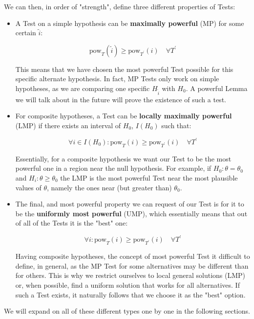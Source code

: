 We can then, in order of "strength", define three different properties of Tests:
\begin{itemize}
\item
A Test on a simple hypothesis can be \textbf{maximally powerful} (MP) for some certain $\tilde{i}$:

	\[
	\text{pow}_T(\tilde{i})\geq\text{pow}_{T^\prime}(i)\quad \forall T^\prime
	\tag{MP Test}
	\]

This means that we have chosen the most powerful Test possible for this specific alternate hypothesis. In fact, MP Tests only work on simple hypotheses, as we are comparing one specific $H_{\tilde{i}}$ with $H_0$. A powerful Lemma we will talk about in the future will prove the existence of such a test. 

\item
For composite hypotheses, a Test can be \textbf{locally maximally powerful} (LMP) if there exists an interval of $H_0$, $I(H_0)$ such that:


	\[
	\forall i\in I(H_0): \text{pow}_T(i) \geq \text{pow}_{T^\prime}(i) \quad \forall T^\prime
	\tag{LMP Test}
	\]

Essentially, for a composite hypothesis we want our Test to be the most powerful one in a region near the null hypothesis. For example, if $H_0: \theta= \theta_0$ and $H_i: \theta\geq\theta_0$ the LMP is the most powerful Test near the most plausible values of $\theta$, namely the ones near (but greater than) $\theta_0$.

\item
The final, and most powerful property we can request of our Test is for it to be the \textbf{uniformly most powerful} (UMP), which essentially means that out of all of the Tests it is the "best" one:

	\[
	\forall i: \text{pow}_T(i) \geq \text{pow}_{T^\prime}(i) \quad \forall T^\prime
	\tag{UMP Test}
	\]

Having composite hypotheses, the concept of most powerful Test it difficult to define, in general, as the MP Test for some alternatives may be different than for others. This is why we restrict ourselves to local general solutions (LMP) or, when possible, find a uniform solution that works for all alternatives. If such a Test exists, it naturally follows that we choose it as the "best" option.
\end{itemize}

We will expand on all of these different types one by one in the following sections.

